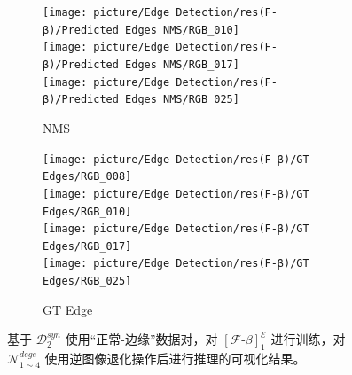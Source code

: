 \documentclass[a4paper]{ctexart}
\begin{document}
\begin{figure}[htbp]
\begin{subfigure}{0.16\textwidth}
			\texttt{[image: picture/Edge Detection/res(F-β)/Predicted Edges NMS/RGB\_010]} \\
			\texttt{[image: picture/Edge Detection/res(F-β)/Predicted Edges NMS/RGB\_017]} \\
			\texttt{[image: picture/Edge Detection/res(F-β)/Predicted Edges NMS/RGB\_025]}
			\caption{NMS}
			\label{fig: NMS}
		\end{subfigure}
		\begin{subfigure}{0.16\textwidth}
			\texttt{[image: picture/Edge Detection/res(F-β)/GT Edges/RGB\_008]} \\
			\texttt{[image: picture/Edge Detection/res(F-β)/GT Edges/RGB\_010]} \\
			\texttt{[image: picture/Edge Detection/res(F-β)/GT Edges/RGB\_017]} \\
			\texttt{[image: picture/Edge Detection/res(F-β)/GT Edges/RGB\_025]}
			\caption{GT Edge}
			\label{fig: GT Edge}
		\end{subfigure}
		
		\caption{基于 $\mathcal{D}^{syn}_{2}$ 使用“正常-边缘”数据对，对 ${\left[\mathcal{F}\text{-}\beta\right]}^{\mathcal{E}}_1$ 进行训练，对 $\mathcal{N}_{1 \sim 4}^{dege}$ 使用逆图像退化操作后进行推理的可视化结果。}
		
	\end{figure}
	
\end{document}
